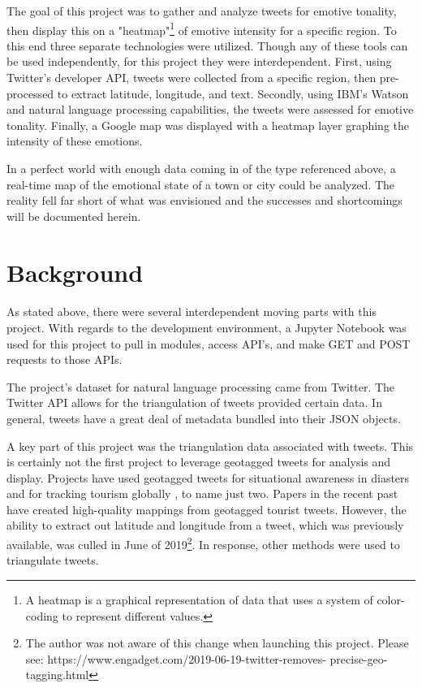 \documentclass[12pt, oneside]{article}
\begin{document}
The goal of this project was to gather and analyze tweets for emotive tonality,
then display this on a "heatmap"\footnote{A heatmap is a graphical
representation of data that uses a system of color-coding to represent
different values.} of emotive intensity for a specific
region. To this end three separate technologies were utilized. Though any of
these tools can be used independently, for this
project they were interdependent. First, using Twitter's
developer API, tweets were collected from a specific region, then
pre-processed to extract latitude, longitude, and text. Secondly, using IBM's
Watson and natural language processing capabilities, the tweets were assessed
for emotive tonality. Finally, a Google map was
displayed with a heatmap layer graphing the intensity of these emotions.

In a perfect world with enough data coming in of the type referenced above, a
real-time map of the emotional state of a town or city could be analyzed. The
reality fell far short of what was envisioned and the successes and
shortcomings will be documented herein.


\section{Background}
\paragraph{}
As stated above, there were several interdependent moving parts with this
project. With regards to the development environment, a Jupyter Notebook was
used for this project to pull in modules, access API's, and make GET and POST
requests to those APIs.

The project's dataset for natural language processing came from Twitter.
The Twitter API allows for the triangulation of tweets provided certain
data\cite{TwitterGeo}. In general, tweets have a great deal of metadata bundled
into their JSON objects.

A key part of this project was the triangulation data associated with
tweets. This is certainly not the first project to leverage geotagged tweets
for analysis and display. Projects have used geotagged tweets for situational
awareness in
diasters\cite{verma2011} and for tracking tourism globally \cite{tourism2013},
to name just two. Papers in the recent past have created high-quality mappings
from geotagged tourist tweets\cite{tourist2018}. However, the ability to
extract out latitude and longitude
from a tweet, which was previously available, was culled in June of
2019\footnote{The author was not aware of this change when launching this
project. Please see: https://www.engadget.com/2019-06-19-twitter-removes-
precise-geo-tagging.html}. In response, other methods were used to triangulate
tweets.
\end{document}

